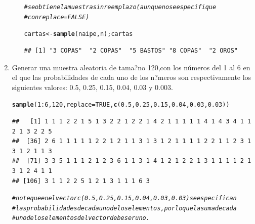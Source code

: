 \documentclass[12pt,letterpaper]{article}\usepackage[]{graphicx}\usepackage[]{color}
\makeatletter
\newcommand{\hlnum}[1]{\textcolor[rgb]{0.686,0.059,0.569}{#1}}%
\newcommand{\hlcom}[1]{\textcolor[rgb]{0.678,0.584,0.686}{\textit{#1}}}%
\newcommand{\hlopt}[1]{\textcolor[rgb]{0,0,0}{#1}}%
\newcommand{\hlstd}[1]{\textcolor[rgb]{0.345,0.345,0.345}{#1}}%
\newcommand{\hlkwb}[1]{\textcolor[rgb]{0.69,0.353,0.396}{#1}}%
\newcommand{\hlkwc}[1]{\textcolor[rgb]{0.333,0.667,0.333}{#1}}%
\newcommand{\hlkwd}[1]{\textcolor[rgb]{0.737,0.353,0.396}{\textbf{#1}}}%
\newenvironment{kframe}{%
 \def\at@end@of@kframe{}%
 \ifinner\ifhmode%
  \def\at@end@of@kframe{\end{minipage}}%
  \begin{minipage}{\columnwidth}%
 \fi\fi%
 \def\FrameCommand##1{\hskip\@totalleftmargin \hskip-\fboxsep
 \colorbox{shadecolor}{##1}\hskip-\fboxsep
     \hskip-\linewidth \hskip-\@totalleftmargin \hskip\columnwidth}%
 \MakeFramed {\advance\hsize-\width
   \@totalleftmargin\z@ \linewidth\hsize
   \@setminipage}}%
 {\par\unskip\endMakeFramed%
 \at@end@of@kframe}
\newenvironment{knitrout}{}{} %
\makeatother
\begin{document}
\begin{enumerate}
\begin{itemize}
\begin{knitrout}
\color{fgcolor}\begin{kframe}
\begin{alltt}
\hlcom{# se obtiene la muestra sin reemplazo (aunque no se especifique }
\hlcom{# con replace=FALSE) }

\hlstd{cartas} \hlkwb{<-} \hlkwd{sample}\hlstd{(naipe, n) ; cartas}
\end{alltt}
\begin{verbatim}
## [1] "3 COPAS"  "2 COPAS"  "5 BASTOS" "8 COPAS"  "2 OROS"
\end{verbatim}
\end{kframe}
\end{knitrout}

\end{itemize}

\item Generar una muestra aleatoria de tama?no 120,con los n\'umeros del 1 
al 6 en el que las probabilidades de cada uno de los n?meros son respectivamente los siguientes valores: 0.5, 0.25, 0.15, 0.04, 0.03 y 0.003.

\begin{knitrout}
\color{fgcolor}\begin{kframe}
\begin{alltt}
\hlkwd{sample}\hlstd{(}\hlnum{1}\hlopt{:}\hlnum{6}\hlstd{,}\hlnum{120}\hlstd{,}\hlkwc{replace}\hlstd{=}\hlnum{TRUE}\hlstd{,} \hlkwd{c}\hlstd{(}\hlnum{0.5}\hlstd{,}\hlnum{0.25}\hlstd{,}\hlnum{0.15}\hlstd{,}\hlnum{0.04}\hlstd{,}\hlnum{0.03}\hlstd{,}\hlnum{0.03}\hlstd{))}
\end{alltt}
\begin{verbatim}
##   [1] 1 1 1 2 2 1 5 1 3 2 2 1 2 2 1 4 2 1 1 1 1 1 4 1 4 3 4 1 1 2 1 3 2 2 5
##  [36] 2 6 1 1 1 1 1 2 2 1 2 1 1 3 1 3 1 2 1 1 1 1 2 2 1 1 2 3 1 3 1 2 1 1 3
##  [71] 3 3 5 1 1 1 2 1 2 3 6 1 1 3 1 4 1 2 1 2 2 1 3 1 1 1 1 2 1 3 1 2 4 1 1
## [106] 3 1 1 2 2 5 1 2 1 3 1 1 1 6 3
\end{verbatim}
\begin{alltt}
 \hlcom{# note que en el vector c(0.5,0.25,0.15,0.04,0.03,0.03) se especifican }
\hlcom{# las probabilidades de cada uno de los elementos, por lo que la suma de cada }
\hlcom{# uno de los elementos del vector debe ser uno. }
\end{alltt}
\end{kframe}
\end{knitrout}


\end{enumerate}
\end{document}
